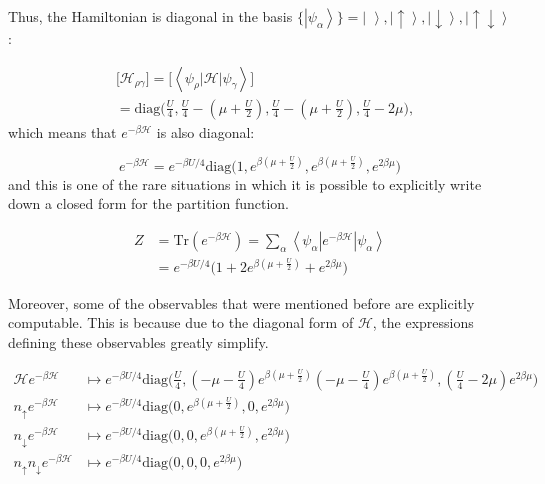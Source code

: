 Thus, the Hamiltonian is diagonal in the basis $\{\left| \psi_\alpha \right\rangle \} = \left| \,\, \right\rangle, \left|\uparrow \right\rangle, \left|\downarrow\right \rangle, \left|\uparrow \downarrow \right\rangle $:

\begin{equation}
\begin{split}
&\bigg[ \mathcal{H}_{\rho\gamma} \bigg] = \bigg[ \left\langle \psi_\rho \left| \mathcal{H} \right| \psi_\gamma \right\rangle \bigg] \\
&= \text{diag}\bigg(\frac{U}{4}, \frac{U}{4} - (\mu + \frac{U}{2} ), \frac{U}{4} - (\mu + \frac{U}{2} ), \frac{U}{4} - 2 \mu \bigg) ,
\end{split}
\end{equation}
which means that $e^{-\beta \mathcal{H} }$ is also diagonal:

\begin{equation}
e^{-\beta \mathcal{H} } = e^{-\beta U / 4}  \text{diag}\bigg(1,  e^{\beta(\mu + \frac{U}{2})}, e^{\beta(\mu + \frac{U}{2})},  e^{2\beta \mu} \bigg)
\end{equation}
and this is one of the rare situations in which it is possible to explicitly write down a closed form for the partition function.

\begin{equation}
\begin{split}
Z &= \text{Tr} ( e^{-\beta\mathcal{H} } ) = \sum_\alpha \left\langle \psi_\alpha \left|e^{-\beta \mathcal{H} } \right| \psi_\alpha \right\rangle \\
&= e^{-\beta U / 4} \bigg(1 + 2 e^{\beta(\mu + \frac{U}{2})} + e^{2 \beta \mu} \bigg)
\end{split}
\end{equation}

Moreover, some of the observables that were mentioned before are explicitly computable.
This is because due to the diagonal form of $\mathcal{H}$, the expressions defining these observables greatly simplify.

\begin{equation}
\begin{split}
\mathcal{H} e^{-\beta\mathcal{H} } &\mapsto e^{-\beta U / 4}  \text{diag}\bigg(\frac{U}{4}, (-\mu - \frac{U}{4})  e^{\beta(\mu + \frac{U}{2})} (-\mu - \frac{U}{4}) e^{\beta(\mu + \frac{U}{2})}, (\frac{U}{4} - 2\mu ) e^{2\beta \mu} \bigg) \\
n_{\uparrow} e^{-\beta\mathcal{H} } &\mapsto e^{-\beta U / 4}  \text{diag}\bigg(0, e^{\beta(\mu + \frac{U}{2})}, 0,  e^{2\beta \mu} \bigg) \\
n_{\downarrow} e^{-\beta\mathcal{H} } &\mapsto e^{-\beta U / 4}  \text{diag}\bigg(0, 0, e^{\beta(\mu + \frac{U}{2})},   e^{2\beta \mu} \bigg) \\
n_{\uparrow} n_{\downarrow} e^{-\beta\mathcal{H} } &\mapsto e^{-\beta U / 4}  \text{diag}\bigg(0, 0, 0,   e^{2\beta \mu} \bigg) \\
\end{split}
\end{equation}

